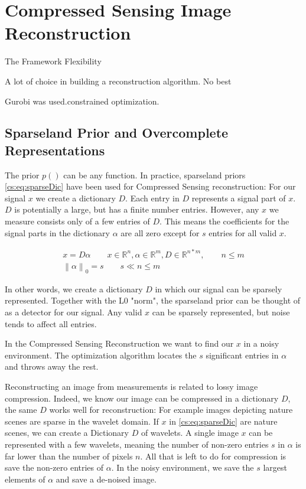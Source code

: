 \section{Compressed Sensing Image Reconstruction} \label{cs}

The Framework Flexibility

A lot of choice in building a reconstruction algorithm. No best

Gurobi\cite{gurobi2018optimizer} was used.constrained optimization.


\subsection{Sparseland Prior and Overcomplete Representations}
The prior $p()$ can be any function. In practice, sparseland priors \eqref{cs:eq:sparseDic} have been used for Compressed Sensing reconstruction: For our signal $x$ we create a dictionary $D$. Each entry in $D$ represents a signal part of $x$. $D$ is potentially a large, but has a finite number entries. However, any $x$ we measure consists only of a few entries of $D$. This means the coefficients for the signal parts in the dictionary $\alpha$ are all zero except for $s$ entries for all valid $x$. 

\begin{equation} \label{cs:eq:sparseDic}
\begin{split}
x = D \alpha  \qquad  x \in \mathbb{R}^{n}, \alpha \in \mathbb{R}^{m}, D \in \mathbb{R}^{n*m}, \qquad n \leq m \\
\left \| \alpha \right \|_0 = s \qquad s \ll n \leq m
\end{split}
\end{equation}

In other words, we create a dictionary $D$ in which our signal can be sparsely represented. Together with the L0 "norm", the sparseland prior can be thought of as a detector for our signal. Any valid $x$ can be sparsely represented, but noise tends to affect all entries.

In the Compressed Sensing Reconstruction we want to find our $x$ in a noisy environment. The optimization algorithm locates the $s$ significant entries in $\alpha$ and throws away the rest.

Reconstructing an image from measurements is related to lossy image compression. Indeed, we know our image can be compressed in a dictionary $D$, the same $D$ works well for reconstruction: For example images depicting nature scenes are sparse in the wavelet domain. If $x$ in \eqref{cs:eq:sparseDic} are nature scenes, we can create a Dictionary $D$ of wavelets. A single image $x$ can be represented with a few wavelets, meaning the number of non-zero entries $s$ in $\alpha$ is far lower than the number of pixels $n$. All that is left to do for compression is save the non-zero entries of $\alpha$. In the noisy environment, we save the $s$ largest elements of $\alpha$ and save a de-noised image.

